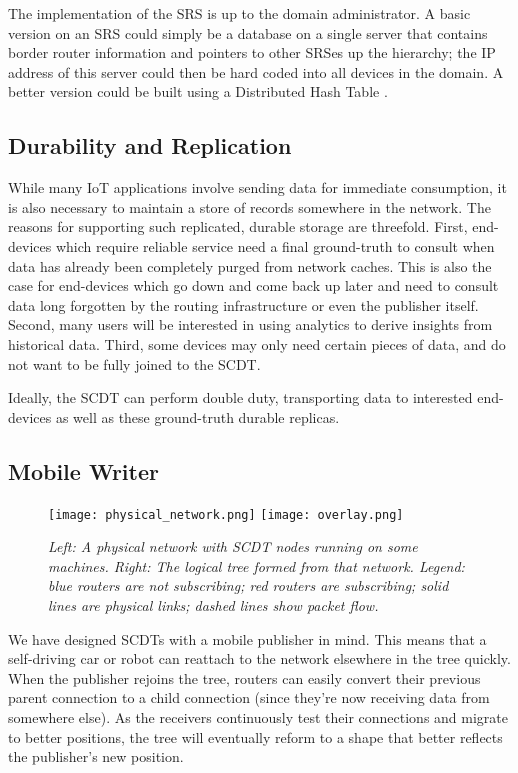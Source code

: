 The implementation of the SRS is up to the domain administrator.  A basic version on an SRS could simply be a database on a single server that contains border router information and pointers to other SRSes up the
hierarchy; the IP address of this server could then be hard coded into all
devices in the domain.  A better version could be built using a Distributed Hash
Table \cite{chord, tapestry}.

\subsection{Durability and Replication}
\label{durability-replication}

While many IoT applications involve sending data for immediate consumption, it is also necessary to maintain a store of records somewhere in the network.  The reasons for supporting such replicated, durable storage are threefold.  First, end-devices which require reliable service need a final ground-truth to consult when data has already been completely purged from network caches.  This is also the case for end-devices which go down and come back up later and need to consult data long forgotten by the routing infrastructure or even the publisher itself.  Second, many users will be interested in using analytics to derive insights from historical data.  Third, some devices may only need certain pieces of data, and do not want to be fully joined to the SCDT.

Ideally, the SCDT can perform double duty, transporting data to interested end-devices as well as these ground-truth durable replicas.

\subsection{Mobile Writer}
\label{mobile-writer}
\begin{figure}[t]
	\begin{center}
		\texttt{[image: physical\_network.png]}
		\texttt{[image: overlay.png]}
	\end{center}
	\vspace{-1.3em}
	\caption{\small \itshape Left: A physical network with SCDT nodes running on some machines.  Right: The logical tree formed from that network.  Legend: blue routers are not subscribing; red routers are subscribing; solid lines are physical links; dashed lines show packet flow.}
	\vspace{-1em}
	\label{fig:multicast-tree}
\end{figure}
We have designed SCDTs with a mobile publisher in mind. This means that a self-driving car or robot can reattach to the network elsewhere in the tree quickly. When the publisher rejoins the tree, routers can easily convert their previous parent connection to a child connection (since they're now receiving data from somewhere else). As the receivers continuously test their connections and migrate to better positions, the tree will eventually reform to a shape that better reflects the publisher's new position.

